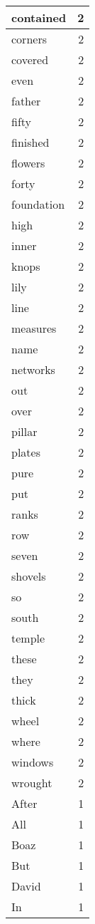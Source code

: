 \begin{center}
\begin{longtable}{l|r}
contained & 2 \\ \hline
corners & 2 \\ \hline
covered & 2 \\ \hline
even & 2 \\ \hline
father & 2 \\ \hline
fifty & 2 \\ \hline
finished & 2 \\ \hline
flowers & 2 \\ \hline
forty & 2 \\ \hline
foundation & 2 \\ \hline
high & 2 \\ \hline
inner & 2 \\ \hline
knops & 2 \\ \hline
lily & 2 \\ \hline
line & 2 \\ \hline
measures & 2 \\ \hline
name & 2 \\ \hline
networks & 2 \\ \hline
out & 2 \\ \hline
over & 2 \\ \hline
pillar & 2 \\ \hline
plates & 2 \\ \hline
pure & 2 \\ \hline
put & 2 \\ \hline
ranks & 2 \\ \hline
row & 2 \\ \hline
seven & 2 \\ \hline
shovels & 2 \\ \hline
so & 2 \\ \hline
south & 2 \\ \hline
temple & 2 \\ \hline
these & 2 \\ \hline
they & 2 \\ \hline
thick & 2 \\ \hline
wheel & 2 \\ \hline
where & 2 \\ \hline
windows & 2 \\ \hline
wrought & 2 \\ \hline
After & 1 \\ \hline
All & 1 \\ \hline
Boaz & 1 \\ \hline
But & 1 \\ \hline
David & 1 \\ \hline
In & 1 \\ \hline

\end{longtable}
\end{center}
